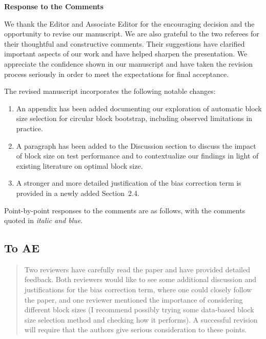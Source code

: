 \documentclass[12pt]{article}
\newenvironment{comment}%
{\begin{quotation}\noindent\small\it\color{darkblue}\ignorespaces%
}{\end{quotation}}
\begin{document}
\begin{center}
  {\Large\bf Response to the Comments}
\end{center}


We thank the Editor and Associate Editor for the encouraging decision
and the opportunity to revise our manuscript. We are also grateful to
the two referees for their thoughtful and constructive comments. Their
suggestions have clarified important aspects of our work and have
helped sharpen the presentation. We appreciate the confidence shown in
our manuscript and have taken the revision process seriously in order
to meet the expectations for final acceptance.


The revised manuscript incorporates the following notable changes:
\begin{enumerate}
\item An appendix has been added documenting our exploration of
  automatic block size selection for circular block bootstrap,
  including observed limitations in practice.
\item  A paragraph has been added to the Discussion section to
  discuss the impact of block size on test performance and to
  contextualize our findings in light of existing literature on
  optimal block size.
\item A stronger and more detailed justification of the bias
  correction term is provided in a newly added Section~2.4.
\end{enumerate}


Point-by-point responses to the comments are as follows, with the
comments quoted in \emph{\color{darkblue} italic and blue}.


\subsection*{To AE}

\begin{comment}
Two reviewers have carefully read the paper and have provided detailed feedback.  Both reviewers would like to see some additional discussion and justifications for the bias correction term, where one could closely follow the \citet{babu2004goodness} paper, and one reviewer mentioned the importance of considering different block sizes (I recommend possibly trying some data-based block size selection method and checking how it performs).  A successful revision will require that the authors give serious consideration to these points.
\end{comment}
\end{document}
